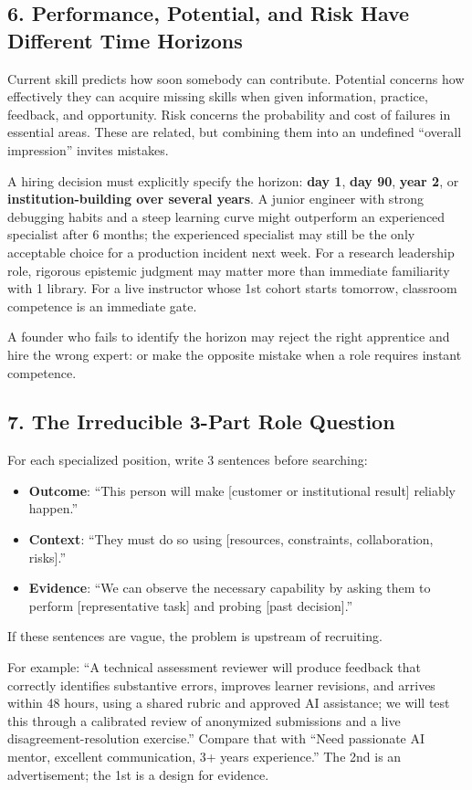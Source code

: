\subsection*{6. Performance, Potential, and Risk Have Different Time Horizons}

Current skill predicts how soon somebody can contribute. Potential concerns how effectively they can acquire missing skills when given information, practice, feedback, and opportunity. Risk concerns the probability and cost of failures in essential areas. These are related, but combining them into an undefined ``overall impression'' invites mistakes.

A hiring decision must explicitly specify the horizon: \textbf{day 1}, \textbf{day 90}, \textbf{year 2}, or \textbf{institution-building over several years}. A junior engineer with strong debugging habits and a steep learning curve might outperform an experienced specialist after 6 months; the experienced specialist may still be the only acceptable choice for a production incident next week. For a research leadership role, rigorous epistemic judgment may matter more than immediate familiarity with 1 library. For a live instructor whose 1st cohort starts tomorrow, classroom competence is an immediate gate.

A founder who fails to identify the horizon may reject the right apprentice and hire the wrong expert: or make the opposite mistake when a role requires instant competence.

\subsection*{7. The Irreducible 3-Part Role Question}

For each specialized position, write 3 sentences before searching:
\begin{itemize}[leftmargin=*]
\item \textbf{Outcome}: ``This person will make [customer or institutional result] reliably happen.''
\item \textbf{Context}: ``They must do so using [resources, constraints, collaboration, risks].''
\item \textbf{Evidence}: ``We can observe the necessary capability by asking them to perform [representative task] and probing [past decision].''
\end{itemize}
If these sentences are vague, the problem is upstream of recruiting.

For example: ``A technical assessment reviewer will produce feedback that correctly identifies substantive errors, improves learner revisions, and arrives within 48 hours, using a shared rubric and approved AI assistance; we will test this through a calibrated review of anonymized submissions and a live disagreement-resolution exercise.'' Compare that with ``Need passionate AI mentor, excellent communication, 3+ years experience.'' The 2nd is an advertisement; the 1st is a design for evidence.

